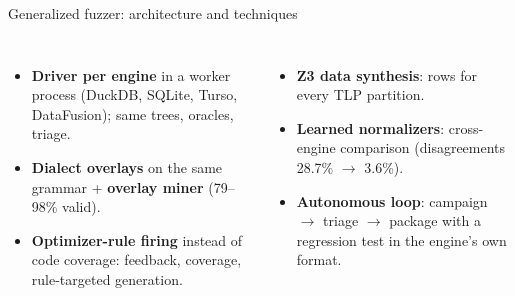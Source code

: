 \documentclass[aspectratio=169,10pt]{beamer}
\begin{document}
\begin{frame}{Generalized fuzzer: architecture and techniques}
\centering\resizebox{!}{0.48\textheight}{}
\scriptsize
\begin{columns}[T]
\begin{itemize}
  \item \textbf{Driver per engine} in a worker process (DuckDB, SQLite, Turso, DataFusion); same trees, oracles, triage.
  \item \textbf{Dialect overlays} on the same grammar + \textbf{overlay miner} (79--98\% valid).
  \item \textbf{Optimizer-rule firing} instead of code coverage: feedback, coverage, rule-targeted generation.
\end{itemize}
\begin{itemize}
  \item \textbf{Z3 data synthesis}: rows for every TLP partition.
  \item \textbf{Learned normalizers}: cross-engine comparison (disagreements 28.7\% $\rightarrow$ 3.6\%).
  \item \textbf{Autonomous loop}: campaign $\rightarrow$ triage $\rightarrow$ package with a regression test in the engine's own format.
\end{itemize}
\end{columns}
\end{frame}
\end{document}
